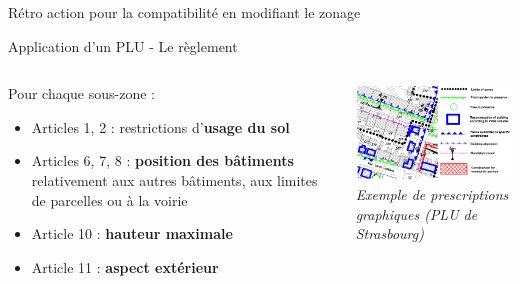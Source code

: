\documentclass[xcolor=table]{beamer}
\begin{document}
\begin{frame}{Rétro action pour la compatibilité en modifiant le zonage}
	
\end{frame}

\begin{frame}{Application d'un PLU - Le règlement}
\begin{columns}[T]
\begin{column}[T]{5cm}
Pour chaque sous-zone : 
\begin{itemize}
\item Articles 1, 2 : restrictions d’\textbf{usage du sol}
\item Articles 6, 7, 8 : \textbf{position des bâtiments} relativement aux autres bâtiments, aux limites de parcelles ou à la voirie
\item Article 10 : \textbf{hauteur maximale}
\item Article 11 : \textbf{aspect extérieur}
\end{itemize}
\end{column}
\begin{column}[T]{5.5cm}
\centering
\includegraphics[width=6cm]{Images/codesplu.png}
\\
\textit{Exemple de prescriptions graphiques (PLU de Strasbourg)}
\end{column}
\end{columns}
\end{frame}
\end{document}
